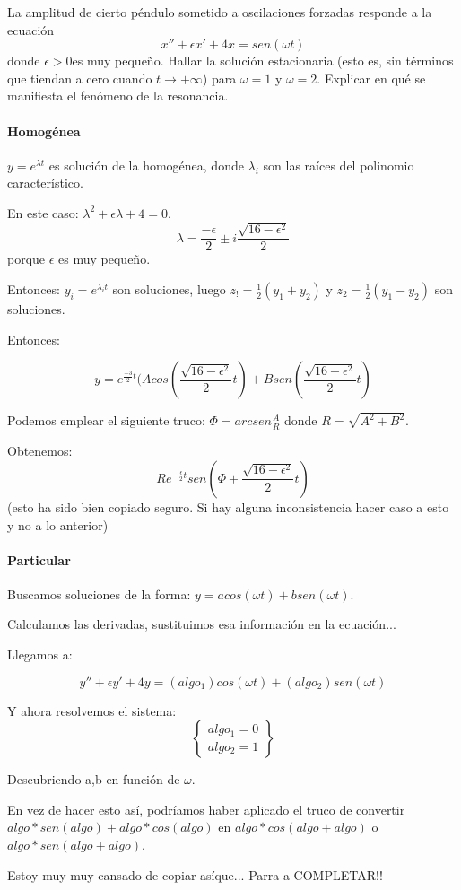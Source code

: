 \documentclass[nochap]{apuntes}
\begin{document}
\begin{problem}[18]
 La amplitud de cierto péndulo sometido a oscilaciones forzadas responde a la ecuación
\[x''+\epsilon x'+4x=sen(\omega t)\]
donde $\epsilon> 0 $es muy pequeño. Hallar la solución estacionaria (esto es, sin términos que tiendan a cero cuando $t → +∞$) para $\omega = 1$ y $\omega = 2$. Explicar en qué se manifiesta el fenómeno de la resonancia.
\solution
\paragraph{Homogénea}

$y = e^{\lambda t}$ es solución de la homogénea, donde $\lambda_i$ son las raíces del polinomio característico.

En este caso: $\lambda^2 + \epsilon \lambda + 4 = 0$.
\[\lambda = \frac{-\epsilon}{2} \pm i \frac{\sqrt{16-\epsilon^2}}{2}\] porque $\epsilon$ es muy pequeño.

Entonces: $y_i = e^{\lambda_i t}$ son soluciones, luego $z_!=\frac{1}{2}(y_1+y_2)$ y $z_2 = \frac{1}{2}(y_1-y_2)$ son soluciones.

Entonces:

\[y=e^{\frac{-3}{2}t}(Acos\left(\frac{\sqrt{16-\epsilon^2}}{2}t\right) + Bsen\left(\frac{\sqrt{16-\epsilon^2}}{2}t\right)\]

Podemos emplear el siguiente truco: $\Phi = arcsen\frac{A}{R} $ donde $R = \sqrt{A^2+B^2}$.

Obtenemos: \[R e^{-\frac{\epsilon}{2}t} sen\left(\Phi + \frac{\sqrt{16-\epsilon^2}}{2}t\right)\] (esto ha sido bien copiado seguro. Si hay alguna inconsistencia hacer caso a esto y no a lo anterior)


\paragraph{Particular} Buscamos soluciones de la forma: $y=acos(\omega t) + b sen(\omega t)$.

Calculamos las derivadas, sustituimos esa información en la ecuación...

Llegamos a:

\[y''+\epsilon y' +4y=(algo_1)cos(\omega t) + (algo_2) sen(\omega t)\]

Y ahora resolvemos el sistema:
\[\left\{\begin{array}{cc}
algo_1=0\\
algo_2=1
\end{array}\right\}\]

Descubriendo a,b en función de $\omega$.

En vez de hacer esto así, podríamos haber aplicado el truco de convertir $algo*sen(algo) + algo*cos(algo)$ en $algo*cos(algo + algo)$ o $algo*sen(algo+algo)$. 

Estoy muy muy cansado de copiar asíque... Parra a COMPLETAR!!



\end{problem}
\end{document}
